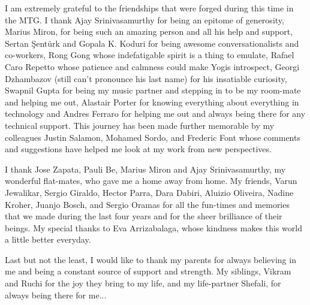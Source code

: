 I am extremely grateful to the friendships that were forged during this time in the MTG. I thank Ajay Srinivasamurthy for being an epitome of generosity, Marius Miron, for being such an amazing person and all his help and support, Sertan \c{S}ent{\"u}rk and Gopala K. Koduri for being awesome conversationalists and co-workers, Rong Gong whose indefatigable spirit is a thing to emulate, Rafael Caro Repetto whose patience and calmness could make Yogis introspect, Georgi Dzhambazov (still can't pronounce his last name) for his insatiable curiosity, Swapnil Gupta for being my music partner and stepping in to be my room-mate and helping me out, Alastair Porter for knowing everything about everything in technology and Andres Ferraro for helping me out and always being there for any technical support. This journey has been made further memorable by my colleagues Justin Salamon, Mohamed Sordo, and Frederic Font whose comments and suggestions have helped me look at my work from new perspectives. 

I thank Jose Zapata, Pauli Be, Marius Miron and Ajay Srinivasamurthy, my wonderful flat-mates, who gave me a home away from home. My friends, Varun Jewalikar, Sergio Giraldo, Hector Parra, Dara Dabiri, Aluizio Oliveira, Nadine Kroher, Juanjo Bosch, and Sergio Oramas for all the fun-times and memories that we made during the last four years and for the sheer brilliance of their beings. My special thanks to Eva Arrizabalaga, whose kindness makes this world a little better everyday.

Last but not the least, I would like to thank my parents for always believing in me and being a constant source of support and strength. My siblings, Vikram and Ruchi for the joy they bring to my life, and my life-partner Shefali, for always being there for me...


%
%
\normalsize